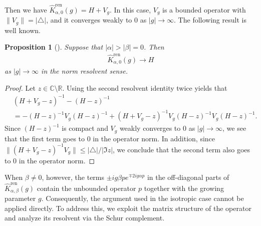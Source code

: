 \documentclass[12pt,dvipdfmx]{article}
\newtheorem{proposition}[theorem]{Proposition}
\newcommand{\RR}{\mathbb{R}}
\newcommand{\CC}{\mathbb{C}}
\begin{document}
Then we have 
$
    \hat{K}^\mathrm{ren} _{\alpha,0}(g) = H + V_g
$. 
In this case, $V_g$ is a bounded operator with $\|V_g\|=|\triangle|$, and it converges weakly to 0 as $|g|\to\infty$. The following result is well known.
%
\begin{proposition}[\cite{Hirokawa15, HMS17}]\label{prop:iso}
Suppose that $|\alpha|>|\beta|=0$. Then 
\begin{align*}
    \hat{K}^\mathrm{ren} _{\alpha,0}(g) \longrightarrow 
    H\end{align*}
as $|g|\to\infty$ in the norm resolvent sense. 
\end{proposition}
%
\begin{proof}
Let $z\in\CC\setminus\RR$. 
Using the second resolvent identity twice yields that 
\begin{align*}
    &\left(H + V_g - z\right)^{-1} - \left(H - z\right)^{-1}
    \\
    &= 
    -\left(H - z\right)^{-1} V_g \left(H - z\right)^{-1} 
    + 
    \left(H + V_g - z\right)^{-1} V_g \left(H - z\right)^{-1} V_g \left(H - z\right)^{-1}.
\end{align*}
Since $(H-z)^{-1}$ is compact and $V_g$ weakly converges to 0 as $|g|\to\infty$, we see that the first term goes to 0 in the operator norm. In addition, since $\| (H + V_g - z)^{-1} V_g \| \leq |\triangle| / |\Im z|$, we conclude that the second term also goes to 0 in the operator norm.
\end{proof}
%
When $\beta\ne0$, however, the terms $\pm ig\beta p e^{\mp2ig\alpha p}$ in the off-diagonal parts of $\hat{K}^\mathrm{ren} _{\alpha,\beta}(g)$ contain the unbounded operator $p$ together with the growing parameter $g$. Consequently, the argument used in the isotropic case cannot be applied directly. To address this, we exploit the matrix structure of the operator and analyze its resolvent via the Schur complement.
%
%
\end{document}
